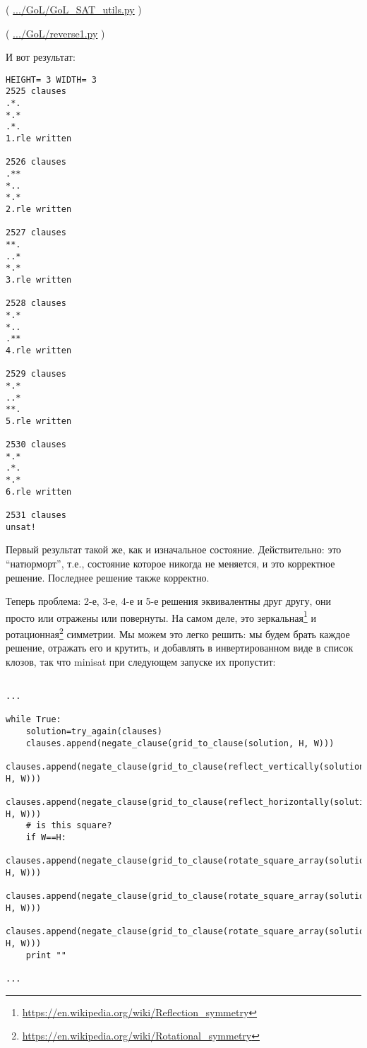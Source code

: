 ( \url{.../GoL/GoL_SAT_utils.py} )



( \url{.../GoL/reverse1.py} )

И вот результат:

\begin{lstlisting}
HEIGHT= 3 WIDTH= 3
2525 clauses
.*.
*.*
.*.
1.rle written

2526 clauses
.**
*..
*.*
2.rle written

2527 clauses
**.
..*
*.*
3.rle written

2528 clauses
*.*
*..
.**
4.rle written

2529 clauses
*.*
..*
**.
5.rle written

2530 clauses
*.*
.*.
*.*
6.rle written

2531 clauses
unsat!
\end{lstlisting}

Первый результат такой же, как и изначальное состояние.
Действительно: это ``натюрморт'', т.е., состояние которое никогда не меняется, и это корректное решение.
Последнее решение также корректно.

Теперь проблема: 2-е, 3-е, 4-е и 5-е решения эквивалентны друг другу, они просто или отражены или повернуты.
На самом деле, это зеркальная\footnote{\url{https://en.wikipedia.org/wiki/Reflection_symmetry}} и 
ротационная\footnote{\url{https://en.wikipedia.org/wiki/Rotational_symmetry}} симметрии.
Мы можем это легко решить: мы будем брать каждое решение, отражать его и крутить, и добавлять в инвертированном виде
в список клозов, так что minisat при следующем запуске их пропустит:

\begin{lstlisting}

...

while True:
    solution=try_again(clauses)
    clauses.append(negate_clause(grid_to_clause(solution, H, W)))
    clauses.append(negate_clause(grid_to_clause(reflect_vertically(solution), H, W)))
    clauses.append(negate_clause(grid_to_clause(reflect_horizontally(solution), H, W)))
    # is this square?
    if W==H:
        clauses.append(negate_clause(grid_to_clause(rotate_square_array(solution,1), H, W)))
        clauses.append(negate_clause(grid_to_clause(rotate_square_array(solution,2), H, W)))
        clauses.append(negate_clause(grid_to_clause(rotate_square_array(solution,3), H, W)))
    print ""

...

\end{lstlisting}

